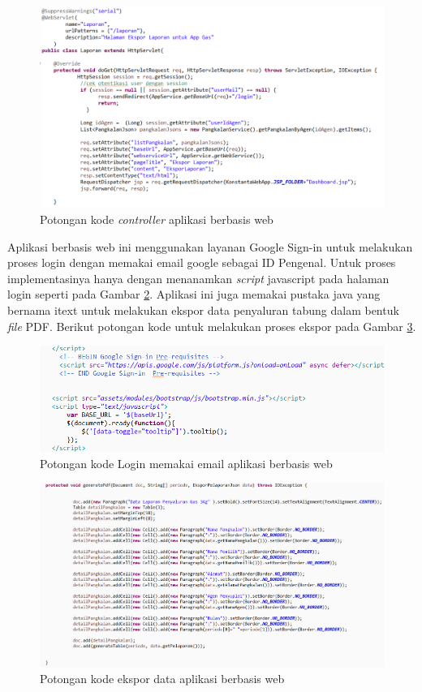 \begin{enumerate}[a.]
		\begin{figure}[H]
			\center
			\includegraphics [width = 14cm]{gambar/kode/controller-web}
			\caption{Potongan kode \textit{controller} aplikasi berbasis web}
			\label{controllerWeb}
		\end{figure}
	
		Aplikasi berbasis web ini menggunakan layanan Google Sign-in untuk melakukan proses login dengan memakai email google sebagai ID Pengenal. Untuk proses implementasinya hanya dengan menanamkan \textit{script} javascript pada halaman login seperti pada Gambar \ref{loginWeb}. Aplikasi ini juga memakai pustaka java yang bernama itext untuk melakukan ekspor data penyaluran tabung dalam bentuk \textit{file} PDF. Berikut potongan kode untuk melakukan proses ekspor pada Gambar \ref{eksporWeb}.
	
		\begin{figure}[H]
			\center
			\includegraphics [width = 14cm]{gambar/kode/login-web}
			\caption{Potongan kode Login memakai email aplikasi berbasis web}
			\label{loginWeb}
		\end{figure}
	
		\begin{figure}[H]
			\center
			\includegraphics [width = 14cm]{gambar/kode/ekspor-web}
			\caption{Potongan kode ekspor data aplikasi berbasis web}
			\label{eksporWeb}
		\end{figure}


\end{enumerate}
